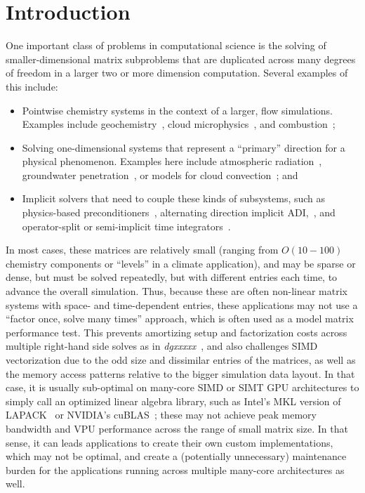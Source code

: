 \documentclass[conference]{IEEEtran}
\begin{document}
\section{Introduction}
% 
One important class of problems in computational science is the solving
  of smaller-dimensional matrix subproblems that are duplicated across
  many degrees of freedom in a larger two or more dimension computation.
Several examples of this include: 
\begin{itemize}
\item Pointwise chemistry systems in the context of a larger, 
  flow simulations. 
Examples include geochemistry~\cite{??}, cloud microphysics~\cite{??},
  and combustion~\cite{??};
\item Solving one-dimensional systems that represent a ``primary''
  direction for a physical phenomenon.
Examples here include atmospheric radiation~\cite{??}, groundwater
  penetration~\cite{??}, or models for cloud convection~\cite{??}; and
\item Implicit solvers that need to couple these kinds of subsystems, 
  such as physics-based preconditioners~\cite{??}, alternating 
  direction implicit ADI,~\cite{??}, and operator-split or
  semi-implicit time integrators~\cite{??}.
\end{itemize}
In most cases, these matrices are relatively small 
  (ranging from $O(10-100)$ chemistry components or ``levels'' 
  in a climate application), and may be sparse or dense, but must 
  be solved repeatedly, but with different entries each time, 
  to advance the overall simulation.
Thus, because these are often non-linear matrix systems with space- and 
  time-dependent entries, these applications may not use a 
  ``factor once, solve many times'' approach, which is often used 
  as a model matrix performance test.
This prevents amortizing setup and factorization costs
  across multiple right-hand side solves as in \emph{dgxxxxx}~\cite{??},
  and also challenges SIMD vectorization due to the odd size and
  dissimilar entries of the matrices, as well as the 
  memory access patterns relative to the bigger simulation data layout.
In that case, it is usually sub-optimal on many-core SIMD 
  or SIMT GPU architectures
  to simply call an optimized linear algebra library, 
  such as Intel's MKL version of LAPACK~\cite{mkl_website} or NVIDIA's
  cuBLAS~\cite{cublas_website}; these may not achieve peak memory bandwidth 
  and VPU performance across the range of small matrix size. 
In that sense, it can leads applications to create their own 
  custom implementations, which may not be optimal, and create a 
  (potentially unnecessary) maintenance burden for the applications 
  running across multiple many-core architectures as well. 
  
\end{document}
